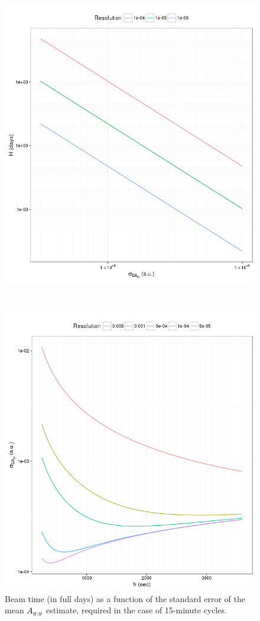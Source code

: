 \documentclass{article}
\begin{document}
\begin{figure}[h]
	\centering
	\begin{minipage}{.5\textwidth}
		\centering
		\includegraphics[scale=.5]{BeamTime_15minCycles}
		\caption{Beam time (in full days) as a function of the standard error of the mean $\Ayy$ estimate, required in the case of 15-minute cycles.\label{fig:BeamTime}}
	\end{minipage}~~~~ %
	\begin{minipage}{.5\textwidth}
		\centering
		\includegraphics[scale=.5]{SEAyy_varB_15min}

\end{minipage}
\end{figure}
\end{document}
